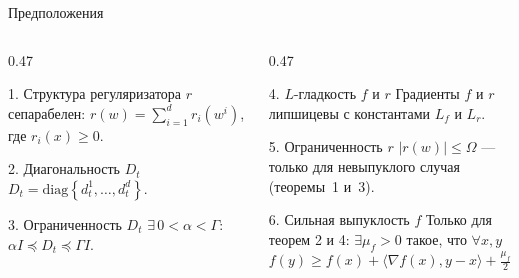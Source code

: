 \documentclass[aspectratio=169, 12pt]{beamer}
\begin{document}
\begin{frame}{Предположения}
\begin{columns}[t]
    \begin{column}{0.47\textwidth}
        \vspace{-0.4cm}
        \begin{block}{1. Структура регуляризатора}
            $r$ сепарабелен: $r(w) = \sum_{i=1}^d r_i(w^i)$, где $r_i(x) \ge 0$.
        \end{block}
        \begin{block}{2. Диагональность $D_t$}
            $D_t = \textrm{diag} \left\{ d_t^1, \ldots, d_t^d \right\}$.
        \end{block}
        \begin{block}{3. Ограниченность $D_t$}
            $\exists\, 0 < \alpha < \Gamma$: $\alpha I \preccurlyeq D_t \preccurlyeq \Gamma I$.
        \end{block}
    \end{column}
    \hspace{0.2cm}
    \vrule
    \hspace{0.2cm}
    \begin{column}{0.47\textwidth}
        \vspace{-0.4cm}
        \begin{block}{4. $L$-гладкость $f$ и $r$}
            Градиенты $f$ и $r$ липшицевы с константами $L_f$ и $L_r$.
        \end{block}
        \begin{block}{5. Ограниченность $r$}
            $|r(w)| \le \Omega$ --- только для невыпуклого случая (теоремы~1 и~3).
        \end{block}
        \begin{block}{6. Сильная выпуклость $f$}
            Только для теорем 2 и 4: $\exists \mu_f > 0$ такое, что $\forall x, y$
            \vspace{-0.15cm}
            {\footnotesize
            \begin{equation*}
                f(y) \geq f(x) + \langle \nabla f(x), y-x \rangle + \tfrac{\mu_f}{2} \|x-y\|^2 .
            \end{equation*}}
        \end{block}
    \end{column}
\end{columns}
\end{frame}
\end{document}
